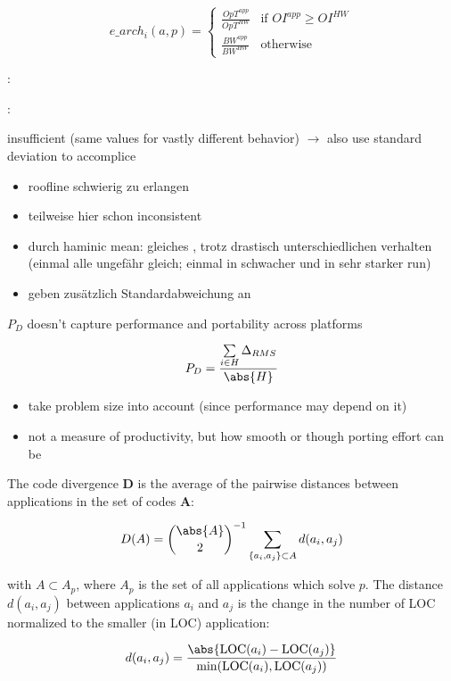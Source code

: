 \begin{definition}
    $$e\_arch_i(a, p) = 
    \begin{cases}
        \frac{OpT^{app}}{OpT^{HW}} & \text{if } OI^{app} \geq OI^{HW} \\
        \frac{BW^{app}}{BW^{HW}} & \text{otherwise}
    \end{cases}$$
    
\end{definition}


: \citet{siklosi_heterogeneous_2018}


: \cite{bertoni_performance_2020}

\pp insufficient (same \pp values for vastly different behavior) $\rightarrow$ also use standard deviation to accomplice \pp 

\begin{itemize}
    \item roofline schwierig zu erlangen 
    \item teilweise hier schon inconsistent
    \item durch haminic mean: gleiches \pp, trotz drastisch unterschiedlichen verhalten (einmal alle ungefähr gleich; einmal in schwacher und in sehr starker run)
    \item geben zusätzlich Standardabweichung an
\end{itemize}


\newpage
\cite{daniel_applying_2019}

$P_D$ doesn't capture performance and portability across platforms

$$P_D = \frac{\sum\limits_{i \in H} \Delta_{RMS}}{\abs{H}}$$

\begin{itemize}
    \item take problem size into account (since performance may depend on it)
    \item not a measure of productivity, but how smooth or though porting effort can be
\end{itemize}

\begin{definition}\label{def:code_div}
The code divergence $\mathbf{D}$ is the average of the pairwise distances between applications in the set of codes $\mathbf{A}$:

$$D(A) = \binom{\abs{A}}{2}^{-1} \sum\limits_{\{a_i, a_j\} \subset A} d(a_i, a_j)$$

with $A \subset A_p$, where $A_p$ is the set of all applications which solve $p$. The distance $d(a_i, a_j)$ between applications $a_i$ and $a_j$ is the change in the number of LOC normalized to the smaller (in LOC) application:

$$d(a_i, a_j) = \frac{\abs{\text{LOC}(a_i) - \text{LOC}(a_j)}}{\min(\text{LOC}(a_i), \text{LOC}(a_j))}$$
    
\end{definition}

